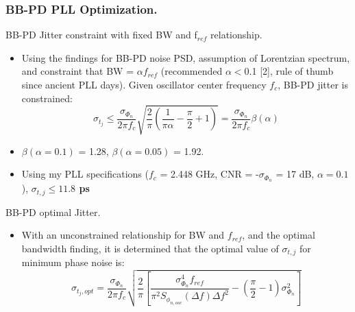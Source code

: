 \documentclass[t, screen, aspectratio=43]{beamer}
\begin{document}
\begin{frame}
	\frametitle{BB-PD PLL Optimization.}
	\begin{block}{BB-PD Jitter constraint with fixed BW and f$_{ref}$ relationship.}
	\tiny
	\begin{itemize}[itemsep=4pt,label=\protect---]
		\item Using the findings for BB-PD noise PSD, assumption of Lorentzian spectrum, and constraint that BW = $\alpha f_{ref}$ (recommended $\alpha$$<$0.1 [2], rule of thumb since ancient PLL days). Given oscillator center frequency $f_c$, BB-PD jitter is constrained:
		\tiny
		\begin{equation}
			\sigma_{t_j} \leq \frac{\sigma_{\Phi_n}}{2\pi f_c}\sqrt{\frac{2}{\pi}\left(\frac{1}{\pi\alpha} - \frac{\pi}{2} + 1\right)} = \frac{\sigma_{\Phi_n}}{2\pi f_c}\beta(\alpha)
		\end{equation}
		\item $\beta(\alpha=0.1)$ = 1.28, $\beta(\alpha=0.05)$ = 1.92.
		\item Using my PLL specifications ($f_c$ = 2.448 GHz, CNR = -$\sigma_{\Phi_n}$ = 17 dB, $\alpha=0.1$), {\color{red}\textbf{$\sigma_{t,j}\leq 11.8 $ ps}}
	\end{itemize}


	\end{block}	
	\begin{block}{BB-PD optimal Jitter.}
	\tiny
	\begin{itemize}[itemsep=4pt,label=\protect---]
		\item With an unconstrained relationship for BW and $f_{ref}$, and the optimal bandwidth finding, it is determined that the optimal value of $\sigma_{t,j}$ for minimum phase noise is:
		\tiny
		\begin{equation}
			\sigma_{t_j,opt} = \frac{\sigma_{\Phi_n}}{2\pi f_c}\sqrt{\frac{2}{\pi}\left[\frac{\sigma^4_{\Phi_n} f_{ref}}{\pi^2 S_{\phi_{n,osc}}(\Delta f) \Delta f^2} - \left(\frac{\pi}{2} - 1\right)\sigma^2_{\Phi_n}\right]}
		\end{equation}

	\end{itemize}


	\end{block}	
\end{frame}
\end{document}
